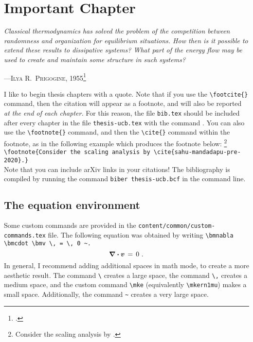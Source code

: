 


%
%

\chapter{Important Chapter} \label{chap_important}
\setcounter{footnote}{0}

\begin{displayquote}
	\selectfont
	\textit{%
		Classical thermodynamics has solved the problem of the competition
		between randomness and organization for equilibrium situations.
		How then is it possible to extend these results to dissipative systems?
		What part of the energy flow may be used to create and maintain some
		structure in such systems?
	}\\[4pt]
	\rule{0mm}{1pt}\hfill---\textsc{Ilya R.\ Prigogine}, 1955\footcite{prigogine}
\end{displayquote}

I like to begin thesis chapters with a quote.
Note that if you use the \verb+\footcite{}+ command, then the citation will appear as a footnote, and will also be reported \textit{at the end of each chapter.}
For this reason, the file \verb+bib.tex+ should be included after every chapter in the file \verb+thesis-ucb.tex+ with the command \verb++.
You can also use the \verb+\footnote{}+ command, and then the \verb+\cite{}+ command within the footnote, as in the following example which produces the footnote below:%
\footnote{Consider the scaling analysis by \cite{sahu-mandadapu-pre-2020}.}
\\[8pt]
\verb+\footnote{Consider the scaling analysis by \cite{sahu-mandadapu-pre-2020}.}+
\\[8pt]
Note that you can include arXiv links in your citations!
The bibliography is compiled by running the command \verb+biber thesis-ucb.bcf+ in the command line.



%
%

\section{The equation environment} \label{sec_equation_environment}

Some custom commands are provided in the \verb+content/common/custom-commands.tex+ file.
The following equation was obtained by writing
\verb+\bmnabla \bmcdot \bmv \, = \, 0 ~.+
\begin{equation}
	\bm{\nabla} \bm{\cdot} \bm{v}
	\, = \, 0
	~.
\end{equation}
In general, I recommend adding additional spaces in math mode, to create a more aesthetic result.
The command \verb+\+ creates a large space, the command \verb+\,+ creates a medium space, and the custom command \verb+\mke+ (equivalently \verb+\mkern1mu+) makes a small space.
Additionally, the command \verb+~+ creates a very large space.



